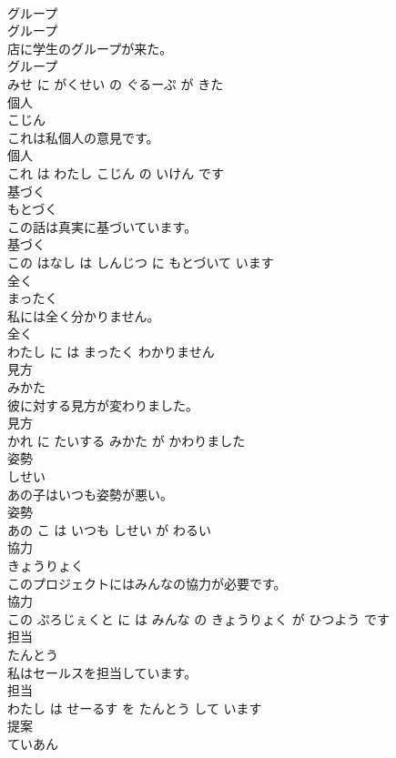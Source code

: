 \documentclass[8pt]{extreport}
\begin{document}
\begin{CJK}{UTF8}{min}
\\	グループ	
\\	グループ			
\\	店に学生のグループが来た。	
\\	グループ 
\\	みせ に がくせい の ぐるーぷ が きた			
\\	個人	
\\	こじん			
\\	これは私個人の意見です。	
\\	個人 
\\	これ は わたし こじん の いけん です			
\\	基づく	
\\	もとづく			
\\	この話は真実に基づいています。	
\\	基づく 
\\	この はなし は しんじつ に もとづいて います			
\\	全く	
\\	まったく			
\\	私には全く分かりません。	
\\	全く 
\\	わたし に は まったく わかりません			
\\	見方	
\\	みかた			
\\	彼に対する見方が変わりました。	
\\	見方 
\\	かれ に たいする みかた が かわりました			
\\	姿勢	
\\	しせい			
\\	あの子はいつも姿勢が悪い。	
\\	姿勢 
\\	あの こ は いつも しせい が わるい			
\\	協力	
\\	きょうりょく			
\\	このプロジェクトにはみんなの協力が必要です。	
\\	協力 
\\	この ぷろじぇくと に は みんな の きょうりょく が ひつよう です			
\\	担当	
\\	たんとう			
\\	私はセールスを担当しています。	
\\	担当 
\\	わたし は せーるす を たんとう して います			
\\	提案	
\\	ていあん			

\end{CJK}
\end{document}
